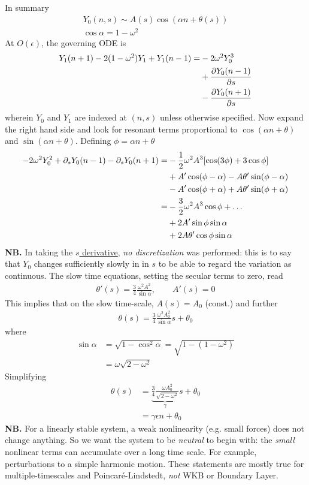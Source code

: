 In summary
\begin{gather*}
	Y_0(n,s) \sim A(s) \cos (\alpha n + \theta(s)) \\
	\cos \alpha = 1 - \omega^2
\end{gather*}
At $O(\epsilon)$, the governing ODE is
\begin{align*}
	Y_1(n+1) - 2(1-\omega^2)Y_1 + Y_1(n-1) =& -2\omega^2 Y_0^3 \\
	 & + \frac{\partial Y_0(n-1)}{\partial s} \\
	 & - \frac{\partial Y_0 (n+1)}{\partial s} 
\end{align*}
wherein $Y_0$ and $Y_1$ are indexed at $(n,s)$ unless otherwise specified. Now expand the right hand side and look for resonant terms proportional to $\cos(\alpha n + \theta)$ and $\sin (\alpha n + \theta)$. Defining $\phi = \alpha n + \theta$
\begin{align*}
	-2 \omega^2 Y_0^2 + \partial_s Y_0(n-1) - \partial_s Y_0(n+1) = &-\frac{1}{2} \omega^2 A^3 [\cos(3\phi) + 3 \cos \phi ] \\
	& + A' \cos (\phi - \alpha) - A \theta' \sin (\phi - \alpha) \\
	& - A' \cos (\phi + \alpha) + A \theta' \sin (\phi + \alpha) \\
	=& -\frac{3}{2} \omega^2 A^3 \cos \phi + \dots \\
	& + 2A' \sin \phi \sin \alpha \\
	& + 2A \theta' \cos \phi \sin \alpha 
\end{align*}
{\bf NB.} In taking the \underline{$s$ derivative}, \emph{no discretization} was performed: this is to say that $Y_0$ changes sufficiently slowly in in $s$ to be able to regard the variation as continuous. The slow time equations, setting the secular terms to zero, read
\begin{gather*}
	\theta'(s) = \frac{3}{4} \frac{\omega^2 A^2}{\sin \alpha}, \qquad A'(s) = 0
\end{gather*}
This implies that on the slow time-scale, $A(s)=A_0$ (const.) and further 
\begin{gather*}
	\theta(s) = \frac{3}{4} \frac{\omega^2 A_0^2}{\sin \alpha} s + \theta_0
\end{gather*}
where
\begin{align*}
	\sin \alpha &= \sqrt{1 - \cos^2 \alpha} = \sqrt{1 - (1-\omega^2)}\\
	&= \omega \sqrt{2 - \omega^2}
\end{align*}
Simplifying 
\begin{align*}
	\theta(s) &= \underbrace{\frac{3}{4} \frac{\omega A_0^2}{\sqrt{2 - \omega^2}}}_\gamma s + \theta_0 \\
	&= \gamma \epsilon n + \theta_0
\end{align*}
{\bf NB. } For a linearly stable system, a weak nonlinearity (e.g. small forces) does not change anything. So we want the system to be \emph{neutral} to begin with: the \emph{small} nonlinear terms can accumulate over a long time scale. For example, perturbations to a simple harmonic motion. These statements are mostly true for multiple-timescales and Poincar\'e-Lindstedt, \emph{not} WKB or Boundary Layer.

